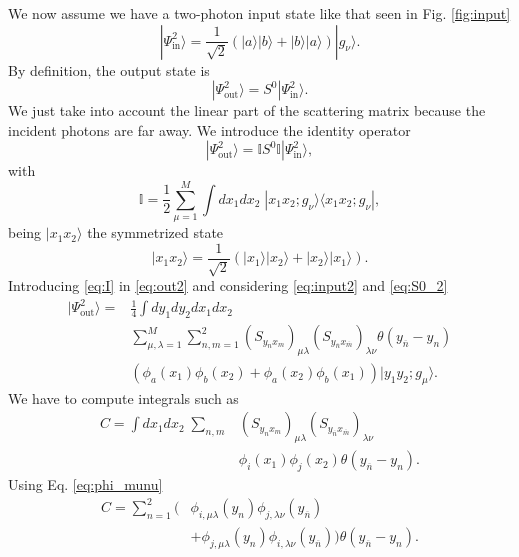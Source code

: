 \documentclass[aps,pra,reprint,amsmath,amssymb]{revtex4-1}
\begin{document}
We now assume we have a two-photon input state like that seen in Fig. \ref{fig:input}
\begin{equation}\label{eq:input2}
|\Psi_\text{in}^2\rangle = \frac{1}{\sqrt{2}}(|a\rangle|b\rangle+|b\rangle|a\rangle)|g_\nu\rangle.
\end{equation}
By definition, the output state is
\begin{equation}
|\Psi_\text{out}^2\rangle = S^0|\Psi_\text{in}^2\rangle.
\end{equation}
We just take into account the linear part of the scattering matrix because the incident photons are far away. We introduce the identity operator
\begin{equation}\label{eq:out2}
|\Psi_\text{out}^2\rangle = \mathbb{I}S^0\mathbb{I}|\Psi_\text{in}^2\rangle,
\end{equation}
with
\begin{equation}\label{eq:I}
\mathbb{I}=\frac{1}{2}\sum_{\mu=1}^M \int dx_1dx_2\;|x_1x_2;g_\nu\rangle \langle x_1x_2;g_\nu|,
\end{equation}
being $|x_1x_2\rangle$ the symmetrized state
\begin{equation}
|x_1x_2\rangle=\frac{1}{\sqrt{2}}(|x_1\rangle|x_2\rangle + |x_2\rangle|x_1\rangle).
\end{equation}
Introducing \eqref{eq:I} in \eqref{eq:out2} and considering \eqref{eq:input2} and \eqref{eq:S0_2}
\begin{align}\label{eq:out2_2}
|\Psi_\text{out}^2\rangle = &\frac{1}{4}\int dy_1dy_2dx_1dx_2\nonumber\\
&\sum_{\mu,\lambda=1}^M\sum_{n,m=1}^2(S_{y_nx_m})_{\mu\lambda} (S_{y_{\overline{n}}x_{\overline{m}}})_{\lambda\nu}\theta(y_{\overline{n}}-y_n)\nonumber\\
&(\phi_a(x_1)\phi_b(x_2)+\phi_a(x_2)\phi_b(x_1))|y_1y_2;g_\mu\rangle.
\end{align}
We have to compute integrals such as
\begin{align}
C=\int dx_1dx_2\;\sum_{n,m}&(S_{y_nx_m})_{\mu\lambda} (S_{y_{\overline{n}}x_{\overline{m}}})_{\lambda\nu}\nonumber\\
&\phi_i(x_1)\phi_j(x_2)\theta(y_{\overline{n}}-y_n).
\end{align}
Using Eq. \eqref{eq:phi_munu}
\begin{align}\label{eq:C1}
C=\sum_{n=1}^2(&\phi_{i,\mu\lambda}(y_n)\phi_{j,\lambda\nu}(y_{\overline{n}}) \nonumber\\
& + \phi_{j,\mu\lambda}(y_n)\phi_{i,\lambda\nu}(y_{\overline{n}}))\theta(y_{\overline{n}}-y_n).
\end{align}
\end{document}
